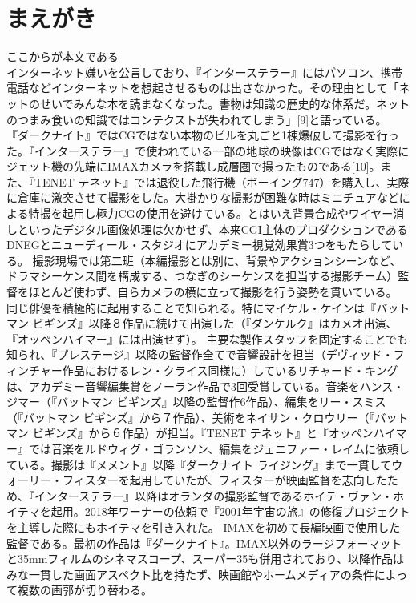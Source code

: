 \documentclass[paper]{ieicej}
\begin{document}
\section{まえがき}
ここからが本文である\\
インターネット嫌いを公言しており、『インターステラー』にはパソコン、携帯電話などインターネットを想起させるものは出さなかった。その理由として「ネットのせいでみんな本を読まなくなった。書物は知識の歴史的な体系だ。ネットのつまみ食いの知識ではコンテクストが失われてしまう」[9]と語っている。
『ダークナイト』ではCGではない本物のビルを丸ごと1棟爆破して撮影を行った。『インターステラー』で使われている一部の地球の映像はCGではなく実際にジェット機の先端にIMAXカメラを搭載し成層圏で撮ったものである[10]。また、『TENET テネット』では退役した飛行機（ボーイング747）を購入し、実際に倉庫に激突させて撮影をした。大掛かりな撮影が困難な時はミニチュアなどによる特撮を起用し極力CGの使用を避けている。とはいえ背景合成やワイヤー消しといったデジタル画像処理は欠かせず、本来CGI主体のプロダクションであるDNEGとニューディール・スタジオにアカデミー視覚効果賞3つをもたらしている。
撮影現場では第二班（本編撮影とは別に、背景やアクションシーンなど、ドラマシーケンス間を構成する、つなぎのシーケンスを担当する撮影チーム）監督をほとんど使わず、自らカメラの横に立って撮影を行う姿勢を貫いている。
同じ俳優を積極的に起用することで知られる。特にマイケル・ケインは『バットマン ビギンズ』以降８作品に続けて出演した（『ダンケルク』はカメオ出演、『オッペンハイマー』には出演せず）。
主要な製作スタッフを固定することでも知られ、『プレステージ』以降の監督作全てで音響設計を担当（デヴィッド・フィンチャー作品におけるレン・クライス同様に）しているリチャード・キングは、アカデミー音響編集賞をノーラン作品で3回受賞している。音楽をハンス・ジマー（『バットマン ビギンズ』以降の監督作6作品）、編集をリー・スミス（『バットマン ビギンズ』から７作品）、美術をネイサン・クロウリー（『バットマン ビギンズ』から６作品）が担当。『TENET テネット』と『オッペンハイマー』では音楽をルドウィグ・ゴランソン、編集をジェニファー・レイムに依頼している。撮影は『メメント』以降『ダークナイト ライジング』まで一貫してウォーリー・フィスターを起用していたが、フィスターが映画監督を志向したため、『インターステラー』以降はオランダの撮影監督であるホイテ・ヴァン・ホイテマを起用。2018年ワーナーの依頼で『2001年宇宙の旅』の修復プロジェクトを主導した際にもホイテマを引き入れた。
IMAXを初めて長編映画で使用した監督である。最初の作品は『ダークナイト』。IMAX以外のラージフォーマットと35mmフィルムのシネマスコープ、スーパー35も併用されており、以降作品はみな一貫した画面アスペクト比を持たず、映画館やホームメディアの条件によって複数の画郭が切り替わる。
\end{document}
